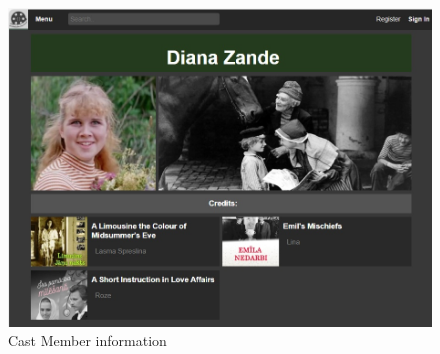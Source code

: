 \documentclass[letterpaper,twocolumn]{article}
\begin{document}
\clearpage
\begin{figure}[h!]
\centering
\includegraphics[scale=0.8]{images/castmemeber.jpg}
\caption{Cast Member information}
\label{castmember}
\end{figure}
\end{document}
